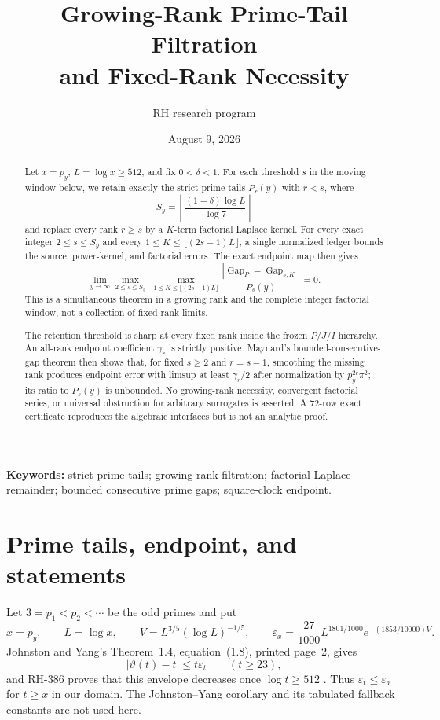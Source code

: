 \documentclass[11pt]{article}
\title{Growing-Rank Prime-Tail Filtration\\
and Fixed-Rank Necessity}
\author{RH research program}
\date{August 9, 2026}
\theoremstyle{definition}
\theoremstyle{remark}
\newcommand{\eps}{\varepsilon}
\newcommand{\GapP}{\operatorname{Gap}_{P}}
\newcommand{\GapSK}{\operatorname{Gap}_{s,K}}
\begin{document}
\maketitle

\begin{abstract}
Let $x=p_y$, $L=\log x\ge512$, and fix $0<\delta<1$.  For each threshold
$s$ in the moving window below, we retain exactly the strict prime tails
$P_r(y)$ with $r<s$, where
\[
 S_y=\left\lfloor\frac{(1-\delta)\log L}{\log7}\right\rfloor
\]
and replace every rank $r\ge s$ by a $K$-term factorial Laplace kernel.
For every exact integer $2\le s\le S_y$ and every
$1\le K\le\lfloor(2s-1)L\rfloor$, a single normalized ledger bounds the
source, power-kernel, and factorial errors.  The exact endpoint map then
gives
\[
 \lim_{y\to\infty}
 \max_{2\le s\le S_y}\;
 \max_{1\le K\le\lfloor(2s-1)L\rfloor}
 \frac{|\GapP-\GapSK|}{P_s(y)}=0.
\]
This is a simultaneous theorem in a growing rank and the complete
integer factorial window, not a collection of fixed-rank limits.

The retention threshold is sharp at every fixed rank inside the frozen
$P/J/I$ hierarchy.  An all-rank endpoint coefficient $\gamma_r$ is
strictly positive.  Maynard's bounded-consecutive-gap theorem then shows
that, for fixed $s\ge2$ and $r=s-1$, smoothing the missing rank produces
endpoint error with limsup at least $\gamma_r/2$ after normalization by
$p_y^{2r}\pi^2$; its ratio to $P_s(y)$ is unbounded.  No growing-rank
necessity, convergent factorial series, or universal obstruction for
arbitrary surrogates is asserted.  A 72-row exact certificate reproduces
the algebraic interfaces but is not an analytic proof.
\end{abstract}

\noindent\textbf{Keywords:} strict prime tails; growing-rank filtration;
factorial Laplace remainder; bounded consecutive prime gaps; square-clock
endpoint.

\section{Prime tails, endpoint, and statements}

Let $3=p_1<p_2<\cdots$ be the odd primes and put
\begin{equation}
 x=p_y,\qquad L=\log x,\qquad
 V=L^{3/5}(\log L)^{-1/5},\qquad
 \eps_x=\frac{27}{1000}L^{1801/1000}
 e^{-(1853/10000)V}.
 \label{eq:domain}
\end{equation}
Johnston and Yang's Theorem~1.4, equation~(1.8), printed page~2, gives
\begin{equation}
 |\vartheta(t)-t|\le t\eps_t\qquad(t\ge23),
 \label{eq:JY}
\end{equation}
and RH-386 proves that this envelope decreases once $\log t\ge512$
\cite{JohnstonYang2023,RH386}.  Thus $\eps_t\le\eps_x$ for $t\ge x$
in our domain.  The Johnston--Yang corollary and its tabulated fallback
constants are not used here.
\end{document}
